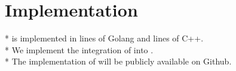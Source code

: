 \section{Implementation}
* \name{} is implemented in  lines of Golang and  lines of C++.\\
* We implement the integration of \smdb{} into \dsdb{}.\\
* The implementation of \name{} will be publicly available on Github.\\